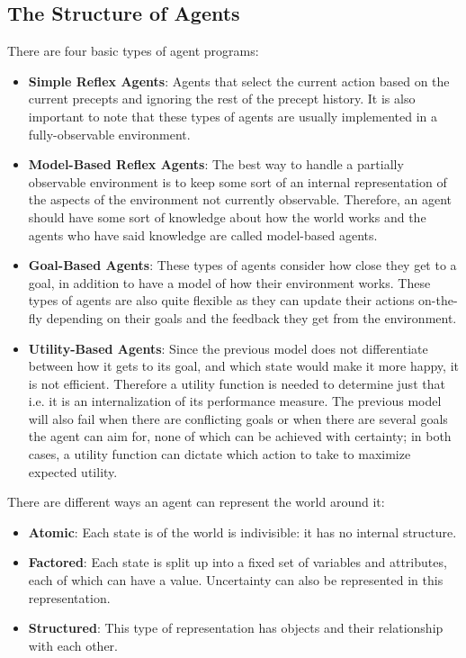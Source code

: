 \documentclass[twoside]{article}
\begin{document}
\subsection{The Structure of Agents}
There are four basic types of agent programs:
\begin{itemize}
        \item \textbf{Simple Reflex Agents}: Agents that select the current
        action based on the current precepts and ignoring the rest of the
        precept history. It is also important to note that these types of
        agents are usually implemented in a fully-observable environment.
        \item \textbf{Model-Based Reflex Agents}: The best way to handle a
        partially observable environment is to keep some sort of an internal
        representation of the aspects of the environment not currently
        observable. Therefore, an agent should have some sort of knowledge
        about how the world works and the agents who have said knowledge are
        called model-based agents.
        \item \textbf{Goal-Based Agents}: These types of agents consider how
        close they get to a goal, in addition to have a model of how their
        environment works. These types of agents are also quite flexible as
        they can update their actions on-the-fly depending on their goals and
        the feedback they get from the environment.
        \item \textbf{Utility-Based Agents}: Since the previous model does not
        differentiate between how it gets to its goal, and which state would
        make it more happy, it is not efficient. Therefore a utility function
        is needed to determine just that i.e. it is an internalization of its
        performance measure. The previous model will also fail when there are
        conflicting goals or when there are several goals the agent can aim
        for, none of which can be achieved with certainty; in both cases,
        a utility function can dictate which action to take to maximize
        expected utility.
\end{itemize}
There are different ways an agent can represent the world around it:
\begin{itemize}
        \item \textbf{Atomic}: Each state is of the world is indivisible: it
        has no internal structure.
        \item \textbf{Factored}: Each state is split up into a fixed set of
        variables and attributes, each of which can have a value. Uncertainty
        can also be represented in this representation.
        \item \textbf{Structured}: This type of representation has objects and
        their relationship with each other.
\end{itemize}
\end{document}
